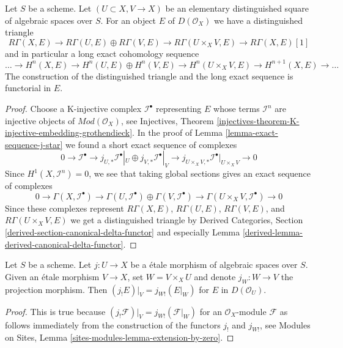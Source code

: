 \begin{lemma}
\label{lemma-unbounded-mayer-vietoris}
Let $S$ be a scheme. Let $(U \subset X, V \to X)$ be an elementary
distinguished square of algebraic spaces over $S$. For an object $E$
of $D(\mathcal{O}_X)$ we have a distinguished triangle
$$
R\Gamma(X, E) \to R\Gamma(U, E) \oplus R\Gamma(V, E) \to
R\Gamma(U \times_X V, E) \to R\Gamma(X, E)[1]
$$
and in particular a long exact cohomology sequence
$$
\ldots \to
H^n(X, E) \to
H^n(U, E) \oplus H^n(V, E) \to
H^n(U \times_X V, E) \to
H^{n + 1}(X, E) \to \ldots
$$
The construction of the distinguished triangle and the
long exact sequence is functorial in $E$.
\end{lemma}

\begin{proof}
Choose a K-injective complex $\mathcal{I}^\bullet$ representing $E$
whose terms $\mathcal{I}^n$ are injective objects of
$\textit{Mod}(\mathcal{O}_X)$, see Injectives, Theorem
\ref{injectives-theorem-K-injective-embedding-grothendieck}.
In the proof of Lemma \ref{lemma-exact-sequence-j-star}
we found a short exact sequence
of complexes
$$
0 \to \mathcal{I}^\bullet \to
j_{U, *}\mathcal{I}^\bullet|_U \oplus j_{V, *}\mathcal{I}^\bullet|_V \to
j_{U \times_X V, *}\mathcal{I}^\bullet|_{U \times_X V} \to 0
$$
Since $H^1(X, \mathcal{I}^n) = 0$, we see that
taking global sections gives an exact sequence of complexes
$$
0 \to \Gamma(X, \mathcal{I}^\bullet) \to
\Gamma(U, \mathcal{I}^\bullet) \oplus
\Gamma(V, \mathcal{I}^\bullet) \to
\Gamma(U \times_X V, \mathcal{I}^\bullet) \to 0
$$
Since these complexes represent
$R\Gamma(X, E)$, $R\Gamma(U, E)$, $R\Gamma(V, E)$, and
$R\Gamma(U \times_X V, E)$ we 
get a distinguished triangle by
Derived Categories, Section
\ref{derived-section-canonical-delta-functor} and especially
Lemma \ref{derived-lemma-derived-canonical-delta-functor}.
\end{proof}

\begin{lemma}
\label{lemma-restrict-lower-shriek}
Let $S$ be a scheme. Let $j : U \to X$ be a \'etale morphism of algebraic
spaces over $S$. Given an \'etale morphism $V \to X$, set $W = V \times_X U$
and denote $j_W : W \to V$ the projection morphism. Then
$(j_!E)|_V = j_{W!}(E|_W)$ for $E$ in $D(\mathcal{O}_U)$.
\end{lemma}

\begin{proof}
This is true because
$(j_!\mathcal{F})|_V = j_{W!}(\mathcal{F}|_W)$
for an $\mathcal{O}_X$-module $\mathcal{F}$ as follows immediately 
from the construction of the functors $j_!$ and $j_{W!}$, see
Modules on Sites, Lemma \ref{sites-modules-lemma-extension-by-zero}.
\end{proof}

